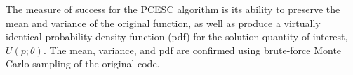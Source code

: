 \documentclass[11pt]{article} %
\begin{document}
The measure of success for the PCESC algorithm is its ability to preserve the mean and variance of the original function, as well as produce a virtually identical probability density function (pdf) for the solution quantity of interest, $U(p;\theta)$.  The mean, variance, and pdf are confirmed using brute-force Monte Carlo sampling of the original code.





\end{document}
